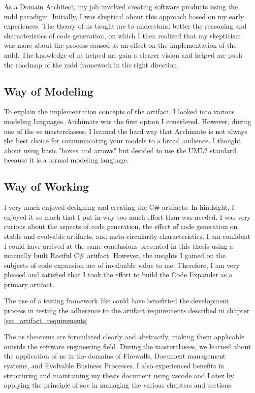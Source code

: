 As a Domain Architect, my job involved creating software products using the \gls{mdd}
paradigm. Initially, I was skeptical about this approach based on my early experiences.
The theory of \gls{ns} taught me to understand better the reasoning and characteristics of
code generation, on which I then realized that my skepticism was more about the process
caused as an effect on the implementation of the \gls{mdd}. The knowledge of \gls{ns}
helped me gain a clearer vision and helped me push the roadmap of the \gls{mdd} framework
in the right direction.

\subsection{Way of Modeling}

To explain the implementation concepts of the artifact, I looked into various modeling
languages. Archimate was the first option I considered. However, during one of the \gls{ee}
masterclasses, I learned the hard way that Archimate is not always the best choice for
communicating your models to a broad audience. I thought about using basic "boxes and
arrows" but decided to use the UML2 standard because it is a formal modeling language.

\subsection{Way of Working}

I very much enjoyed designing and creating the C\# artifacts. In hindsight, I enjoyed it
so much that I put in way too much effort than was needed. I was very curious about the
aspects of code generation, the effect of code generation on stable and evolvable
artifacts, and meta-circularity characteristics. I am confident I could have arrived at
the same conclusions presented in this thesis using a manually built Restful C\# artifact.
However, the insights I gained on the subjects of code expansion are of invaluable value
to me. Therefore, I am very pleased and satisfied that I took the effort to build the Code
Expander as a primary artifact.

The use of a testing framework like 
\parencite*{github_archunitnet_2023} could have benefitted the development process in
testing the adherence to the artifact requirements described in chapter
\ref{sec_artifact_requirements}

The \gls{ns} theorems are formulated clearly and abstractly, making them applicable
outside the software engineering field. During the masterclasses, we learned about the
application of \gls{ns} in the domains of Firewalls, Document management systems, and
Evolvable Business Processes. I also experienced benefits in structuring and maintaining
my thesis document using \gls{vscode} and Latex by applying the principle of \gls{soc} in
managing the various chapters and sections. 

